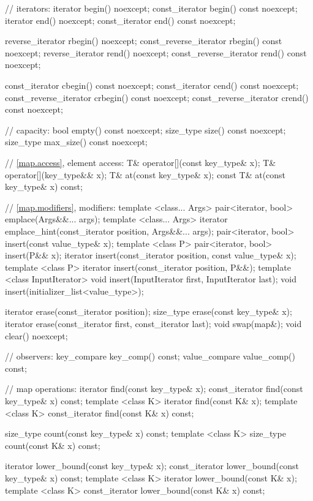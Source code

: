\begin{codeblock}
{{    // iterators:
    iterator               begin() noexcept;
    const_iterator         begin() const noexcept;
    iterator               end() noexcept;
    const_iterator         end() const noexcept;

    reverse_iterator       rbegin() noexcept;
    const_reverse_iterator rbegin() const noexcept;
    reverse_iterator       rend() noexcept;
    const_reverse_iterator rend() const noexcept;

    const_iterator         cbegin() const noexcept;
    const_iterator         cend() const noexcept;
    const_reverse_iterator crbegin() const noexcept;
    const_reverse_iterator crend() const noexcept;

    // capacity:
    bool      empty() const noexcept;
    size_type size() const noexcept;
    size_type max_size() const noexcept;

    // \ref{map.access}, element access:
    T& operator[](const key_type& x);
    T& operator[](key_type&& x);
    T&       at(const key_type& x);
    const T& at(const key_type& x) const;

    // \ref{map.modifiers}, modifiers:
    template <class... Args> pair<iterator, bool> emplace(Args&&... args);
    template <class... Args> iterator emplace_hint(const_iterator position, Args&&... args);
    pair<iterator, bool> insert(const value_type& x);
    template <class P> pair<iterator, bool> insert(P&& x);
    iterator insert(const_iterator position, const value_type& x);
    template <class P>
      iterator insert(const_iterator position, P&&);
    template <class InputIterator>
      void insert(InputIterator first, InputIterator last);
    void insert(initializer_list<value_type>);

    iterator  erase(const_iterator position);
    size_type erase(const key_type& x);
    iterator  erase(const_iterator first, const_iterator last);
    void swap(map&);
    void clear() noexcept;

    // observers:
    key_compare   key_comp() const;
    value_compare value_comp() const;

    // map operations:
    iterator       find(const key_type& x);
    const_iterator find(const key_type& x) const;
    template <class K> iterator       find(const K& x);
    template <class K> const_iterator find(const K& x) const;

    size_type      count(const key_type& x) const;
    template <class K> size_type count(const K& x) const;

    iterator       lower_bound(const key_type& x);
    const_iterator lower_bound(const key_type& x) const;
    template <class K> iterator       lower_bound(const K& x);
    template <class K> const_iterator lower_bound(const K& x) const;

}}
\end{codeblock}
